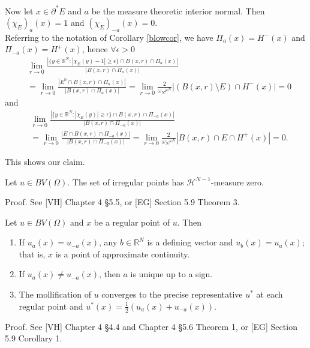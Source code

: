 \begin{example}
Now let $x \in \partial^{*}E$ and $a$ be the measure theoretic interior normal. Then $(\chi_{E})_{a}(x) = 1$ and $(\chi_{E})_{-a}(x) = 0$.
\\
Referring to the notation of Corollary \ref{blowcor}, we have $\Pi_{a}(x) = H^{-}(x)$ and \\
$\Pi_{-a}(x) = H^{+}(x)$, hence $\forall \epsilon > 0$
\begin{align*} & \lim_{r \to 0} \frac{|\{y \in \mathbb{R}^{N} : |\chi_{E}(y) - 1| \ge \epsilon \} \cap B(x,r) \cap \Pi_{a}(x)|}{|B(x, r) \cap \Pi_{a}(x)|} \\
&= \lim_{r \to 0} \frac{|E^{0} \cap B(x, r) \cap \Pi_{a}(x)|}{|B(x, r) \cap \Pi_{a}(x)|}  = \lim_{r \to 0} \frac{2}{\omega_{N} r^{N}} | (B(x, r) \setminus E ) \cap H^{-}(x)| = 0
\end{align*}
and
\begin{align*} & \lim_{r \to 0} \frac{|\{y \in \mathbb{R}^{N} : |\chi_{E}(y)| \ge \epsilon \} \cap B(x,r) \cap \Pi_{-a}(x)|}{|B(x, r) \cap \Pi_{-a}(x)|} \\ 
&= \lim_{r \to 0} \frac{|E \cap B(x, r) \cap \Pi_{-a}(x)|}{|B(x, r) \cap \Pi_{-a}(x)|} = \lim_{r \to 0} \frac{2}{\omega_{N} r^{N}} | B(x, r) \cap E \cap H^{+}(x)| = 0.
\end{align*}

This shows our claim.

\end{example}



\begin{theorem} \label{irregularpoints} Let $u \in BV(\Omega)$. The set of irregular points has $\mathcal{H}^{N-1}$-measure zero.
\end{theorem}

Proof. See [VH] Chapter 4 §5.5, or [EG] Section 5.9 Theorem 3.

\begin{theorem} \label{regularpoints} Let $u \in BV(\Omega)$ and $x$ be a regular point of $u$. Then
\begin{enumerate}
	\item If $u_{a}(x) = u_{-a}(x)$, any $b \in \mathbb{R}^{N}$ is a defining vector and $u_{b}(x) = u_{a}(x)$; that is, $x$ is a point of approximate continuity. 
	\item If $u_{a}(x) \neq u_{-a}(x)$, then $a$ is unique up to a sign.
	\item The mollification of $u$ converges to the precise representative $u^{*}$ at each regular point and $u^{*}(x) = \frac{1}{2} (u_{a}(x) + u_{-a}(x) )$.
\end{enumerate}
\end{theorem}
Proof. See [VH] Chapter 4 §4.4 and Chapter 4 §5.6 Theorem 1, or [EG] Section 5.9 Corollary 1.

